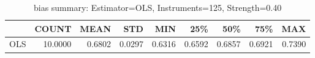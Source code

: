 \begin{table}[ht]
\centering
\caption{bias summary: Estimator=OLS, Instruments=125, Strength=0.40}
\begin{tabular}{lrrrrrrrr}
\toprule
 & COUNT & MEAN & STD & MIN & 25\% & 50\% & 75\% & MAX \\
\midrule
OLS & 10.0000 & 0.6802 & 0.0297 & 0.6316 & 0.6592 & 0.6857 & 0.6921 & 0.7390 \\
\bottomrule
\end{tabular}
\end{table}
